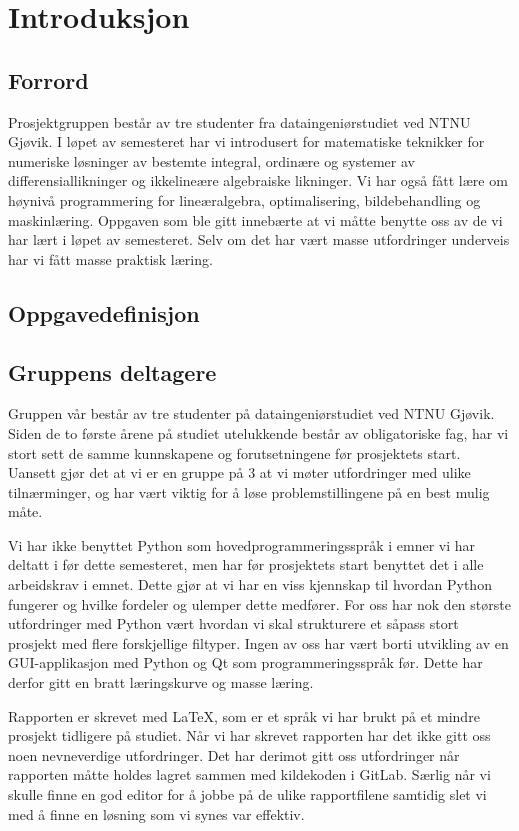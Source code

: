 \section{Introduksjon}

\subsection{Forrord}
Prosjektgruppen består av tre studenter fra dataingeniørstudiet ved NTNU Gjøvik. I løpet av 
semesteret har vi introdusert for matematiske teknikker for numeriske løsninger av bestemte 
integral, ordinære og systemer av differensiallikninger og ikkelineære algebraiske likninger. 
Vi har også fått lære om høynivå programmering for lineæralgebra, optimalisering, bildebehandling 
og maskinlæring. Oppgaven som ble gitt innebærte at vi måtte benytte oss av de vi har lært i løpet
av semesteret. Selv om det har vært masse utfordringer underveis har vi fått masse praktisk 
læring. 

\subsection{Oppgavedefinisjon}

\subsection{Gruppens deltagere}
Gruppen vår består av tre studenter på dataingeniørstudiet ved NTNU Gjøvik. Siden de to første årene på
studiet utelukkende består av obligatoriske fag, har vi stort sett de samme kunnskapene og 
forutsetningene før prosjektets start. Uansett gjør det at vi er en gruppe på 3 at vi møter utfordringer
med ulike tilnærminger, og har vært viktig for å løse problemstillingene på en best mulig måte.

Vi har ikke benyttet Python som hovedprogrammeringsspråk i emner vi har deltatt i før dette semesteret,
men har før prosjektets start benyttet det i alle arbeidskrav i emnet. Dette gjør at vi har en viss 
kjennskap til hvordan Python fungerer og hvilke fordeler og ulemper dette medfører. For oss har nok den 
største utfordringer med Python vært hvordan vi skal strukturere et såpass stort prosjekt med flere forskjellige filtyper. Ingen av oss har vært borti utvikling av en GUI-applikasjon med Python og Qt som 
programmeringsspråk før. Dette har derfor gitt en bratt læringskurve og masse læring.

Rapporten er skrevet med LaTeX, som er et språk vi har brukt på et mindre prosjekt tidligere på studiet.
Når vi har skrevet rapporten har det ikke gitt oss noen nevneverdige utfordringer. Det har derimot gitt
oss utfordringer når rapporten måtte holdes lagret sammen med kildekoden i GitLab. Særlig når vi skulle
finne en god editor for å jobbe på de ulike rapportfilene samtidig slet vi med å finne en løsning som 
vi synes var effektiv.

